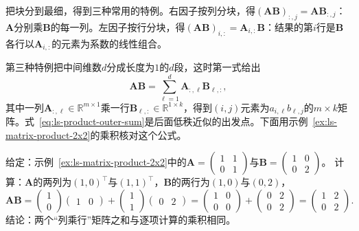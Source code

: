 把块分到最细，得到三种常用的特例。右因子按列分块，得$(\bm A\bm B)_{:,j}=\bm A\bm B_{:,j}$：$\bm A$分别乘$\bm B$的每一列。左因子按行分块，得$(\bm A\bm B)_{i,:}=\bm A_{i,:}\bm B$：结果的第$i$行是$\bm B$各行以$\bm A_{i,:}$的元素为系数的线性组合。

第三种特例把中间维数$d$分成长度为$1$的$d$段，这时第一式给出
\begin{equation}
 \bm A\bm B=\sum_{\ell=1}^d\bm A_{:,\ell}\bm B_{\ell,:},
 \label{eq:ls-product-outer-sum}
\end{equation}
其中一列$\bm A_{:,\ell}\in\mathbb R^{m\times1}$乘一行$\bm B_{\ell,:}\in\mathbb R^{1\times k}$，得到$(i,j)$元素为$a_{i,\ell}b_{\ell,j}$的$m\times k$矩阵。式~\eqref{eq:ls-product-outer-sum}是后面低秩近似的出发点。下面用示例~\ref{ex:ls-matrix-product-2x2}的乘积核对这个公式。
\begin{example}[把乘积写成列乘行之和]
\label{ex:ls-product-as-outer-sum}
给定：示例~\ref{ex:ls-matrix-product-2x2}中的$\bm A=\left(\begin{smallmatrix}1&1\\0&1\end{smallmatrix}\right)$与$\bm B=\left(\begin{smallmatrix}1&0\\0&2\end{smallmatrix}\right)$。
计算：$\bm A$的两列为$(1,0)^\top$与$(1,1)^\top$，$\bm B$的两行为$(1,0)$与$(0,2)$，
\[
 \bm A\bm B=\begin{pmatrix}1\\0\end{pmatrix}\begin{pmatrix}1&0\end{pmatrix}+\begin{pmatrix}1\\1\end{pmatrix}\begin{pmatrix}0&2\end{pmatrix}
 =\begin{pmatrix}1&0\\0&0\end{pmatrix}+\begin{pmatrix}0&2\\0&2\end{pmatrix}=\begin{pmatrix}1&2\\0&2\end{pmatrix}.
\]
结论：两个“列乘行”矩阵之和与逐项计算的乘积相同。
\end{example}

